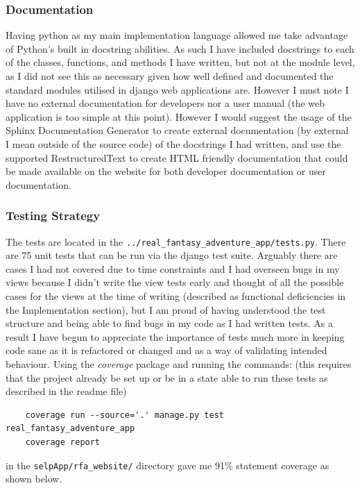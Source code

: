 \documentclass[11pt,a4paper]{article}
\begin{document}
\subsubsection{Documentation}
Having python as my main implementation language allowed me take advantage of Python's built in docstring abilities. As such I have included docstrings to each of the classes, functions, and methods I have written, but not at the module level, as I did not see this as necessary given how well defined and documented the standard modules utilised in django web applications are. However I must note I have no external documentation for developers nor a user manual (the web application is too simple at this point). However I would suggest the usage of the Sphinx Documentation Generator to create external documentation (by external I mean outside of the source code) of the docstrings I had written, and use the supported RestructuredText to create HTML friendly documentation that could be made available on the website for both developer documentation or user documentation. 

\subsubsection{Testing Strategy}
The tests are located in the \verb|../real_fantasy_adventure_app/tests.py|. There are 75 unit tests that can be run via the django test suite. Arguably there are cases I had not covered due to time constraints and I had overseen bugs in my views because I didn't write the view tests early and thought of all the possible cases for the views at the time of writing (described as functional deficiencies in the Implementation section), but I am proud of having understood the test structure and being able to find bugs in my code as I had written tests. As a result I have begun to appreciate the importance of tests much more in keeping code sane as it is refactored or changed and as a way of validating intended behaviour. Using the \textit{coverage} package and running the commands: (this requires that the project already be set up or be in a state able to run these tests as described in the readme file)

\begin{verbatim}
	coverage run --source='.' manage.py test real_fantasy_adventure_app
	coverage report
\end{verbatim}

in the \verb|selpApp/rfa_website/| directory gave me 91\% statement coverage as shown below.
\end{document}
